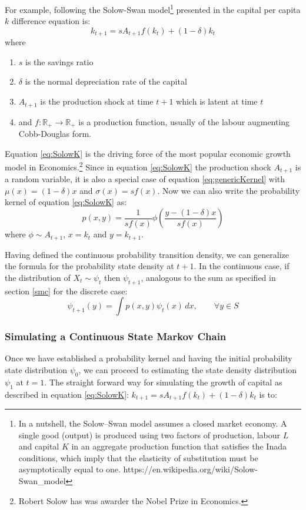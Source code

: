 \documentclass[a4paper,12pt]{article}
\theoremstyle{definition}
\begin{document}
For example, following the Solow-Swan model\footnote{In a nutshell, the Solow–Swan model assumes a closed market economy. A single good (output) is produced using two factors of production, labour $L$ and capital $K$ in an aggregate production function that satisfies the Inada conditions, which imply that the elasticity of substitution must be asymptotically equal to one. https://en.wikipedia.org/wiki/Solow-Swan\_model} presented in \cite{Romer06} the capital per capita $k$ difference equation is:
\begin{equation}\label{eq:SolowK}
k_{t+1} = s  A_{t+1} f(k_t) + (1 - \delta) k_t
\end{equation}
where 
\begin{enumerate}
\item $s$ is the savings ratio
\item $\delta$ is the normal depreciation rate of the capital
\item $A_{t+1}$ is the production shock at time $t+1$ which is latent at time $t$
\item and $f \colon \mathbb R_+ \to \mathbb R_+$ is a production function, usually of the labour augmenting Cobb-Douglas form.
\end{enumerate} 
Equation \ref{eq:SolowK} is the driving force of the most popular economic growth model in Economics.\footnote{Robert Solow has was awarder the Nobel Prize in Economics.} 
Since in equation \ref{eq:SolowK} the production shock $A_{t+1}$ is a random variable, it is also a special case of equation \ref{eq:genericKernel} with $\mu (x) = (1-\delta)x$ and $\sigma (x) = sf(x)$. Now we can also write the probability kernel of equation \ref{eq:SolowK} as:
\begin{equation}
p(x, y) = \frac{1}{sf(x)} \phi \left( \frac{y - (1 - \delta) x}{s f(x)} \right)
\end{equation} 
where $\phi \sim A_{t+1}$, $x = k_t$ and $y=k_{t+1}$.

Having defined the continuous probability transition density, we can generalize the formula for the probability state density at $t+1$.  In the continuous case, if the distribution of $X_t \sim \psi_t$ then $\psi_{t+1}$, analogous to the sum as specified in section \ref{smc} for the discrete case:
\begin{equation}\label{eq:CSMC_probVec}
\psi_{t+1}(y) = \int p(x,y) \psi_t(x) \, dx,
\qquad \forall y \in S
\end{equation}

\subsubsection{Simulating a Continuous State Markov Chain}
Once we have established a probability kernel and having the initial probability state distribution $\psi_0$, we can proceed to estimating the state density distribution $\psi_1$ at $t=1$. The straight forward way for simulating the growth of capital as described in equation \ref{eq:SolowK}: $k_{t+1} = s  A_{t+1} f(k_t) + (1 - \delta) k_t$ is to:
\end{document}
